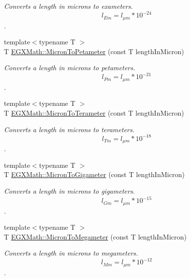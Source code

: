 \begin{DoxyCompactItemize}
\begin{DoxyCompactList}\small\item\em Converts a length in microns to exameters. \[ l_{Em}=l_{\mu m} * 10^{-24} \]. \end{DoxyCompactList}\item 
{\footnotesize template$<$typename T $>$ }\\T \mbox{\hyperlink{group___e_g_x_math-_conversions-_length_conversions-_non-_s_i-_micron-_s_i_ga2260fe792831ea80f1d61c3b876d1f11}{E\+G\+X\+Math\+::\+Micron\+To\+Petameter}} (const T length\+In\+Micron)
\begin{DoxyCompactList}\small\item\em Converts a length in microns to petameters. \[ l_{Pm}=l_{\mu m} * 10^{-21} \]. \end{DoxyCompactList}\item 
{\footnotesize template$<$typename T $>$ }\\T \mbox{\hyperlink{group___e_g_x_math-_conversions-_length_conversions-_non-_s_i-_micron-_s_i_gaa71029484f59849bac474cfbeda0db5d}{E\+G\+X\+Math\+::\+Micron\+To\+Terameter}} (const T length\+In\+Micron)
\begin{DoxyCompactList}\small\item\em Converts a length in microns to terameters. \[ l_{Tm}=l_{\mu m} * 10^{-18} \]. \end{DoxyCompactList}\item 
{\footnotesize template$<$typename T $>$ }\\T \mbox{\hyperlink{group___e_g_x_math-_conversions-_length_conversions-_non-_s_i-_micron-_s_i_ga412ce50d9e2bf7647e420e4f6365f9a2}{E\+G\+X\+Math\+::\+Micron\+To\+Gigameter}} (const T length\+In\+Micron)
\begin{DoxyCompactList}\small\item\em Converts a length in microns to gigameters. \[ l_{Gm}=l_{\mu m} * 10^{-15} \]. \end{DoxyCompactList}\item 
{\footnotesize template$<$typename T $>$ }\\T \mbox{\hyperlink{group___e_g_x_math-_conversions-_length_conversions-_non-_s_i-_micron-_s_i_ga044475633903b9766ffd7685e7198600}{E\+G\+X\+Math\+::\+Micron\+To\+Megameter}} (const T length\+In\+Micron)
\begin{DoxyCompactList}\small\item\em Converts a length in microns to megameters. \[ l_{Mm}=l_{\mu m} * 10^{-12} \]. \end{DoxyCompactList}\item 

\end{DoxyCompactItemize}
